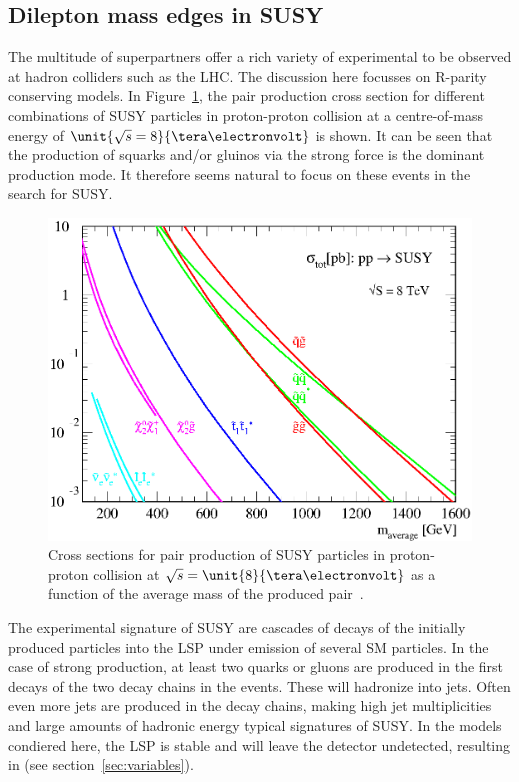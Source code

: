 \subsection{Dilepton mass edges in SUSY}
\label{sec:edges}
The multitude of superpartners offer a rich variety of experimental to be observed at hadron colliders such as the LHC. The discussion here focusses on R-parity conserving models. In Figure~\ref{fig:SUSYXSecs}, the pair production cross section for different combinations of SUSY particles in proton-proton collision at a centre-of-mass energy of $\unit{\sqrt{s}=8}{\tera\electronvolt}$ is shown. It can be seen that the production of squarks and/or gluinos via the strong force is the dominant production mode. It therefore seems natural to focus on these events in the search for SUSY.
\begin{figure}
\centering
\includegraphics[scale=0.6]{plots/THEO/prospino_lhc8.eps}
\caption{Cross sections for pair production of SUSY particles in proton-proton collision at $\sqrt{s} = \unit{8}{\tera\electronvolt}$ as a function of the average mass of the produced pair~\cite{ProspinoPlot,Beenakker:1999xh,Beenakker:1997ut,bib-nlo-nll-01}.}
\label{fig:SUSYXSecs}
\end{figure}

The experimental signature of SUSY are cascades of decays of the initially produced particles into the LSP under emission of several SM particles. In the case of strong production, at least two quarks or gluons are produced in the first decays of the two decay chains in the events. These will hadronize into jets. Often even more jets are produced in the decay chains, making high jet multiplicities and large amounts of hadronic energy typical signatures of SUSY. In the models condiered here, the LSP is stable and will leave the detector undetected, resulting in \MET (see section~\ref{sec:variables}).

